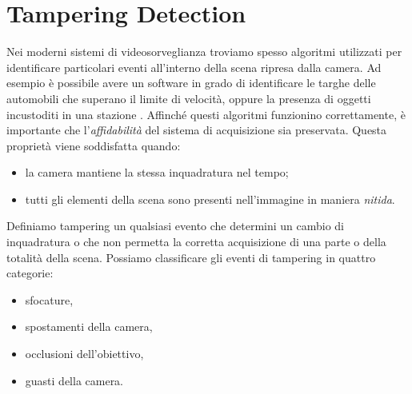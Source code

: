 \section{Tampering Detection}
Nei moderni sistemi di videosorveglianza troviamo spesso algoritmi utilizzati per identificare particolari eventi all'interno della scena ripresa dalla camera. 
Ad esempio \`e possibile avere un software in grado di identificare le targhe delle automobili che superano il limite di velocit\`a, oppure la presenza di oggetti incustoditi in una stazione \cite{Targhe}.
Affinch\'e questi algoritmi funzionino correttamente, \`e importante che l'\textit{affidabilit\`a} del sistema di acquisizione sia preservata.
Questa propriet\`a viene soddisfatta quando:
\begin{itemize}
	\item la camera mantiene la stessa inquadratura nel tempo;
	\item tutti gli elementi della scena sono presenti nell'immagine in maniera \textit{nitida}.
\end{itemize}
Definiamo \gls{tampering} un qualsiasi evento che determini un cambio di inquadratura o che non permetta la corretta acquisizione di una parte o della totalit\`a della scena.
Possiamo classificare gli eventi di tampering in quattro categorie:
\begin{itemize}
	\item sfocature,
	\item spostamenti della camera,
	\item occlusioni dell'obiettivo,
	\item guasti della camera.
\end{itemize}

